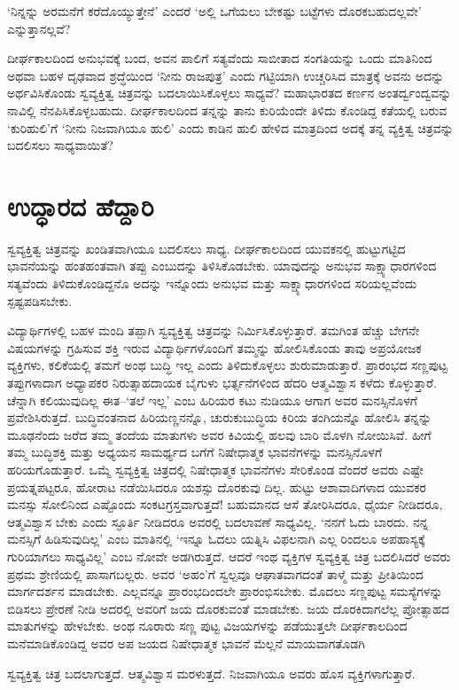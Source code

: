 ‘ನಿನ್ನನ್ನು ಅರಮನೆಗೆ ಕರೆದೊಯ್ಯುತ್ತೇನೆ’ ಎಂದರೆ ‘ಅಲ್ಲಿ ಒಗೆಯಲು ಬೇಕಷ್ಟು ಬಟ್ಟೆಗಳು ದೊರಕಬಹುದಲ್ಲವೇ’ ಎನ್ನುತ್ತಾನಲ್ಲವೆ?

ದೀರ್ಘಕಾಲದಿಂದ ಅನುಭವಕ್ಕೆ ಬಂದ, ಅವನ ಪಾಲಿಗೆ ಸತ್ಯವೆಂದು ಸಾಬೀತಾದ ಸಂಗತಿಯನ್ನು ಒಂದು ಮಾತಿನಿಂದ ಅಥವಾ ಬಹಳ ದೃಢವಾದ ಶ್ರದ್ಧೆಯಿಂದ ‘ನೀನು ರಾಜಪುತ್ರ’ ಎಂದು ಗಟ್ಟಿಯಾಗಿ ಉಚ್ಚರಿಸಿದ ಮಾತ್ರಕ್ಕೆ ಅವನು ಅದನ್ನು ಅರ್ಥವಿಸಿಕೊಂಡು ಸ್ವವ್ಯಕ್ತಿತ್ವ ಚಿತ್ರವನ್ನು ಬದಲಾಯಿಸಿಕೊಳ್ಳಲು ಸಾಧ್ಯವೆ? ಮಹಾಭಾರತದ ಕರ್ಣನ ಅಂತರ್ದ್ವಂದ್ವವನ್ನು ನಾವಿಲ್ಲಿ ನೆನಪಿಸಿಕೊಳ್ಳಬಹುದು. ದೀರ್ಘಕಾಲದಿಂದ ತನ್ನನ್ನು ತಾನು ಕುರಿಯೆಂದೇ ತಿಳಿದು ಕೊಂಡಿದ್ದ ಕತೆಯಲ್ಲಿ ಬರುವ ‘ಕುರಿಹುಲಿ’ಗೆ ‘ನೀನು ನಿಜವಾಗಿಯೂ ಹುಲಿ’ ಎಂದು ಕಾಡಿನ ಹುಲಿ ಹೇಳಿದ ಮಾತ್ರದಿಂದ ಅದಕ್ಕೆ ತನ್ನ ವ್ಯಕ್ತಿತ್ವ ಚಿತ್ರವನ್ನು ಬದಲಿಸಲು ಸಾಧ್ಯವಾಯಿತೆ?


\section*{ಉದ್ಧಾರದ ಹೆದ್ದಾರಿ}

ಸ್ವವ್ಯಕ್ತಿತ್ವ ಚಿತ್ರವನ್ನು ಖಂಡಿತವಾಗಿಯೂ ಬದಲಿಸಲು ಸಾಧ್ಯ. ದೀರ್ಘಕಾಲದಿಂದ ಯುವಕನಲ್ಲಿ ಹುಟ್ಟುಗಟ್ಟಿದ ಭಾವನೆಯನ್ನು ಹಂತಹಂತವಾಗಿ ತಪ್ಪು ಎಂಬುದನ್ನು ತಿಳಿಸಿಕೊಡಬೇಕು. ಯಾವುದನ್ನು ಅನುಭವ ಸಾಕ್ಷ್ಯಾಧಾರಗಳಿಂದ ಸತ್ಯವೆಂದು ತಿಳಿದುಕೊಂಡಿದ್ದನೊ ಅದನ್ನು ಇನ್ನೊಂದು ಅನುಭವ ಮತ್ತು ಸಾಕ್ಷ್ಯಾಧಾರಗಳಿಂದ ಸರಿಯಲ್ಲವೆಂದು ಸ್ಪಷ್ಟಪಡಿಸಬೇಕು.

{ ವಿದ್ಯಾರ್ಥಿಗಳಲ್ಲಿ ಬಹಳ ಮಂದಿ ತಪ್ಪಾಗಿ ಸ್ವವ್ಯಕ್ತಿತ್ವ ಚಿತ್ರವನ್ನು ನಿರ್ಮಿಸಿಕೊಳ್ಳುತ್ತಾರೆ. ತಮಗಿಂತ ಹೆಚ್ಚು ಬೇಗನೇ ವಿಷಯಗಳನ್ನು ಗ್ರಹಿಸುವ ಶಕ್ತಿ ಇರುವ ವಿದ್ಯಾರ್ಥಿಗಳೊಂದಿಗೆ ತಮ್ಮನ್ನು ಹೋಲಿಸಿಕೊಂಡು ತಾವು ಅಪ್ರಯೋಜಕ ವ್ಯಕ್ತಿಗಳು, ಕಲಿಕೆಯಲ್ಲಿ ತಮಗೆ ಅಂಥ ಬುದ್ಧಿ ಇಲ್ಲ ಎಂದು ತಿಳಿದುಕೊಳ್ಳಲು ಶುರುಮಾಡುತ್ತಾರೆ. ಪ್ರಾರಂಭದ ಸಣ್ಣಪುಟ್ಟ ತಪ್ಪುಗಳಾದಾಗ ಅಧ್ಯಾಪಕರ ನಿರುತ್ಸಾಹದಾಯಕ ಬೈಗುಳು ಭರ್ತ್ಸನೆಗಳಿಂದ ಹೆದರಿ ಆತ್ಮವಿಶ್ವಾಸ ಕಳೆದು ಕೊಳ್ಳುತ್ತಾರೆ. ಚೆನ್ನಾಗಿ ಕಲಿಯುವುದಿಲ್ಲ ಈತ–‘ತಲೆ ಇಲ್ಲ’ ಎಂಬ ಹಿರಿಯರ ಕಟು ನುಡಿಯೂ ಆಗಾಗ ಅವರ ಮನಸ್ಸಿ\-ನೊಳಗೆ ಪ್ರವೇಶಿಸಿರುತ್ತದೆ. ಬುದ್ಧಿವಂತನಾದ ಹಿರಿಯಣ್ಣನನ್ನೊ, ಚುರುಕುಬುದ್ಧಿಯ ಕಿರಿಯ ತಂಗಿಯನ್ನೊ ಹೋಲಿಸಿ ತನ್ನನ್ನು ಮೂಢನೆಂದು ಜರೆದ ತಮ್ಮ ತಂದೆಯ ಮಾತುಗಳು ಅವರ ಕಿವಿಯಲ್ಲಿ ಹಲವು ಬಾರಿ ಮೊಳಗಿ ನೋಯಿಸಿವೆ. ಹೀಗೆ ತಮ್ಮ ಬುದ್ಧಿಶಕ್ತಿ ಮತ್ತು ಅಧ್ಯಯನ ಸಾಮರ್ಥ್ಯದ ಬಗೆಗೆ ನಿಷೇಧಾತ್ಮಕ ಭಾವನೆಗಳನ್ನು ಮನಸ್ಸಿನೊಳಗೆ ಹರಿಯಗೊಡುತ್ತಾರೆ. ಒಮ್ಮೆ ಸ್ವವ್ಯಕ್ತಿತ್ವ ಚಿತ್ರದಲ್ಲಿ ನಿಷೇಧಾತ್ಮಕ ಭಾವನೆಗಳು ಸೇರಿಕೊಂಡ ವೆಂದರೆ ಅವರು ಎಷ್ಟೇ ಪ್ರಯತ್ನ\-ಪಟ್ಟರೂ, ಹೋರಾಟ ನಡೆಯಿಸಿದರೂ ಯಶಸ್ಸು ದೊರಕುವು ದಿಲ್ಲ. ಹುಟ್ಟು ಆಶಾವಾದಿಗಳಾದ ಯುವಕರ ಮನಸ್ಸು ಸೋಲಿನಿಂದ ಎಷ್ಟೊಂದು ಸಂಕಟಗ್ರಸ್ತವಾಗುತ್ತದೆ! ಬಹುಮಾನದ ಆಸೆ ತೋರಿಸಿದರೂ, ಧೈರ್ಯ ನೀಡಿದರೂ, ಆತ್ಮವಿಶ್ವಾಸ ಬೇಕು ಎಂದು ಸ್ಫೂರ್ತಿ ನೀಡಿದರೂ ಅವರಲ್ಲಿ ಬದಲಾವಣೆ ಸಾಧ್ಯವಿಲ್ಲ. ‘ನನಗೆ ಓದು ಬಾರದು. ನನ್ನ ಮನಸ್ಸಿಗೆ ಹಿಡಿಸುವುದಿಲ್ಲ’ ಎಂಬ ಮಾತಿನಲ್ಲಿ ‘ಇನ್ನೂ ಓದಲು ಯತ್ನಿಸಿ ವಿಫಲನಾಗಿ ಎಲ್ಲ ರಿಂದಲೂ ಅಪಹಾಸ್ಯಕ್ಕೆ ಗುರಿಯಾಗಲು ಸಾಧ್ಯವಿಲ್ಲ’ ಎಂಬ ನೋವೇ ಅಡಗಿರುತ್ತದೆ. ಆದರೆ ಇಂಥ ವ್ಯಕ್ತಿಗಳ ಸ್ವವ್ಯಕ್ತಿತ್ವ ಚಿತ್ರ ಬದಲಿಸಿದರೆ ಅವರು ಪ್ರಥಮ ಶ್ರೇಣಿಯಲ್ಲಿ ಪಾಸಾಗಬಲ್ಲರು. ಅವರ ‘ಅಹಂ’ಗೆ ಸ್ವಲ್ಪವೂ ಆಘಾತವಾಗದಂತೆ ತಾಳ್ಮೆ ಮತ್ತು ಪ್ರೀತಿಯಿಂದ ಮಾರ್ಗದರ್ಶನ ಮಾಡಬೇಕು. ಎಲ್ಲವನ್ನೂ ಪ್ರಾರಂಭದಿಂದಲೇ ಪ್ರಾರಂಭಿಸಬೇಕು. ಮೊದಲು ಸಣ್ಣಪುಟ್ಟ ಸಮಸ್ಯೆಗಳನ್ನು ಬಿಡಿಸಲು ಪ್ರೇರಣೆ ನೀಡಿ ಅದರಲ್ಲಿ ಅವರಿಗೆ ಜಯ ದೊರಕುವಂತೆ ಮಾಡಬೇಕು. ಜಯ ದೊರಕಿದಾಗಲೆಲ್ಲ ಪ್ರೋತ್ಸಾಹದ ಮಾತುಗಳನ್ನು ಹೇಳಬೇಕು. ಅಂಥ ನೂರಾರು ಸಣ್ಣ ಪುಟ್ಟ ವಿಜಯಗಳನ್ನು ಪಡೆಯುತ್ತಲೇ ದೀರ್ಘಕಾಲದಿಂದ ಮನೆಮಾಡಿಕೊಂಡಿದ್ದ ಅವರ ಅಪ ಜಯದ ನಿಷೇಧಾತ್ಮಕ ಭಾವನೆ ಮೆಲ್ಲನೆ ಮಾಯವಾಗತೊಡಗಿ\parfillskip=0pt\par}\newpage \noindent ಸ್ವವ್ಯಕ್ತಿತ್ವ ಚಿತ್ರ ಬದಲಾಗುತ್ತದೆ. ಆತ್ಮವಿಶ್ವಾಸ ಮರಳುತ್ತದೆ. ನಿಜವಾಗಿಯೂ ಅವರು ಹೊಸ ವ್ಯಕ್ತಿಗಳಾಗುತ್ತಾರೆ.

